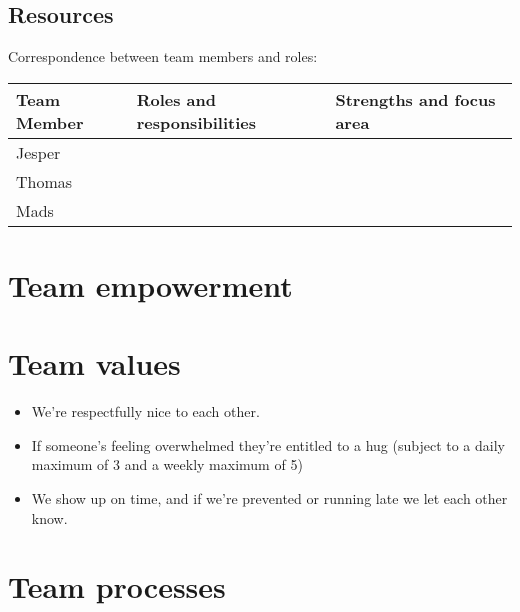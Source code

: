 \documentclass[a4paper,11pt]{article}
\begin{document}
\subsection{Resources} %
\label{subsec:resources}
Correspondence between team members and roles:

\begin{tabular}{|p{3cm}|p{5cm}|p{5cm}|}
\hline
\textbf{Team Member}              & \textbf{Roles and responsibilities}   & \textbf{Strengths and focus area} \\\hline
Jesper                   &                              &                          \\\hline
Thomas                   &                              &                          \\\hline
Mads                     &                              &                          \\\hline 
\end{tabular}


\section{Team empowerment} %
\label{sec:team_empowerment}


\section{Team values} %
\label{sec:team_values}

\begin{itemize}
  \item We're respectfully nice to each other.
  \item If someone's feeling overwhelmed they're entitled to a hug (subject to a daily maximum of 3 and a weekly maximum of 5)
  \item We show up on time, and if we're prevented or running late we let each other know.
\end{itemize}


\section{Team processes} %
\label{sec:team_processes}
\end{document}
